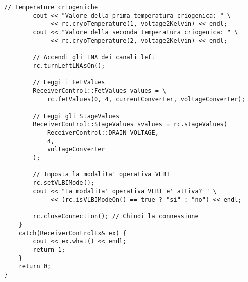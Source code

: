 \begin{lstlisting}[caption={[Esempio di utilizzo della libreria \texttt{ReceiverLibrary}]Esempio 
di utilizzo della libreria \texttt{ReceiverLibrary}},
label=lst:receiver-library,mathescape]
        // Temperature criogeniche
        cout << "Valore della prima temperatura criogenica: " \
             << rc.cryoTemperature(1, voltage2Kelvin) << endl;
        cout << "Valore della seconda temperatura criogenica: " \
             << rc.cryoTemperature(2, voltage2Kelvin) << endl;

        // Accendi gli LNA dei canali left
        rc.turnLeftLNAsOn();

        // Leggi i FetValues
        ReceiverControl::FetValues values = \
            rc.fetValues(0, 4, currentConverter, voltageConverter);

        // Leggi gli StageValues
        ReceiverControl::StageValues svalues = rc.stageValues(
            ReceiverControl::DRAIN_VOLTAGE,
            4,
            voltageConverter
        );

        // Imposta la modalita' operativa VLBI
        rc.setVLBIMode();
        cout << "La modalita' operativa VLBI e' attiva? " \
             << (rc.isVLBIModeOn() == true ? "si" : "no") << endl;

        rc.closeConnection(); // Chiudi la connessione
    }
    catch(ReceiverControlEx& ex) {
        cout << ex.what() << endl;
        return 1;
    }
    return 0;
}
\end{lstlisting}
\lstset{numbers=none}

